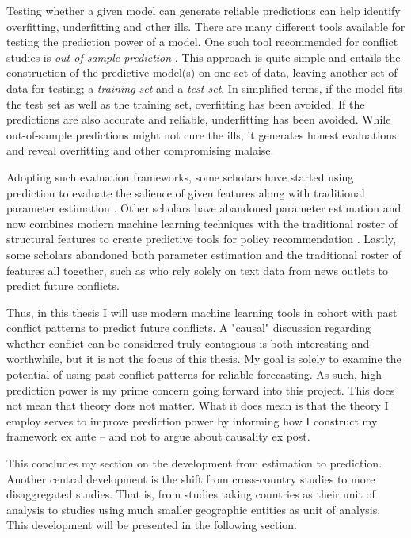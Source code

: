 \documentclass[a4paper]{article}
\begin{document}
Testing whether a given model can generate reliable predictions can help identify overfitting, underfitting and other ills. There are many different tools available for testing the prediction power of a model. One such tool recommended for conflict studies is \emph{out-of-sample prediction} \citep{king_zeng_2001b, Ward_Greenhill_Bakke_2010, perry_2013, Schrodt_2014}. This approach is quite simple and entails the construction of the predictive model(s) on one set of data, leaving another set of data for testing; a \emph{training set} and a \emph{test set}. In simplified terms, if the model fits the test set as well as the training set, overfitting has been avoided. If the predictions are also accurate and reliable, underfitting has been avoided. While out-of-sample predictions might not cure the ills, it generates honest evaluations and reveal overfitting and other compromising malaise.\par

Adopting such evaluation frameworks, some scholars have started using prediction to evaluate the salience of given features along with traditional parameter estimation \citep{Goldstone_2010}. Other scholars have abandoned parameter estimation and now combines modern machine learning techniques with the traditional roster of structural features to create predictive tools for policy recommendation \citep{perry_2013}. Lastly, some scholars abandoned both parameter estimation and the traditional roster of features all together, such as \cite{mueller_2016} who rely solely on text data from news outlets to predict future conflicts.\par

Thus, in this thesis I will use modern machine learning tools in cohort with past conflict patterns to predict future conflicts. A "causal" discussion regarding whether conflict can be considered truly contagious is both interesting and worthwhile, but it is not the focus of this thesis. My goal is solely to examine the potential of using past conflict patterns for reliable forecasting. As such, high prediction power is my prime concern going forward into this project. This does not mean that theory does not matter. What it does mean is that the theory I employ serves to improve prediction power by informing how I construct my framework ex ante -- and not to argue about causality ex post.\par 

This concludes my section on the development from estimation to prediction. Another central development is the shift from cross-country studies to more disaggregated studies. That is, from studies taking countries as their unit of analysis to studies using much smaller geographic entities as unit of analysis. This development will be presented in the following section.\par
\end{document}
